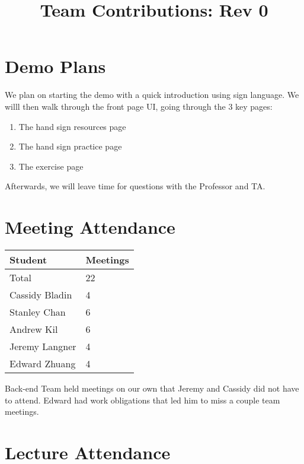 \documentclass{article}
\title{Team Contributions: Rev 0\\\progname}
\author{\authname}
\date{}
\begin{document}
\maketitle

\section{Demo Plans}

We plan on starting the demo with a quick introduction using sign language. We willl then walk through the front page UI, going through the 3 key pages:
\begin{enumerate}
    \item The hand sign resources page
    \item The hand sign practice page
    \item The exercise page
\end{enumerate}
Afterwards, we will leave time for questions with the Professor and TA.

\section{Meeting Attendance}


\begin{table}[H]
\centering
\begin{tabular}{ll}
\toprule
\textbf{Student} & \textbf{Meetings}\\
\midrule
Total & 22\\
Cassidy Bladin & 4\\
Stanley Chan & 6\\
Andrew Kil & 6\\
Jeremy Langner & 4\\
Edward Zhuang & 4\\
\bottomrule
\end{tabular}
\end{table}

\noindent Back-end Team held meetings on our own that Jeremy and Cassidy did not have to attend. Edward had work obligations that led him to miss a couple team meetings.

\section{Lecture Attendance}
\end{document}
